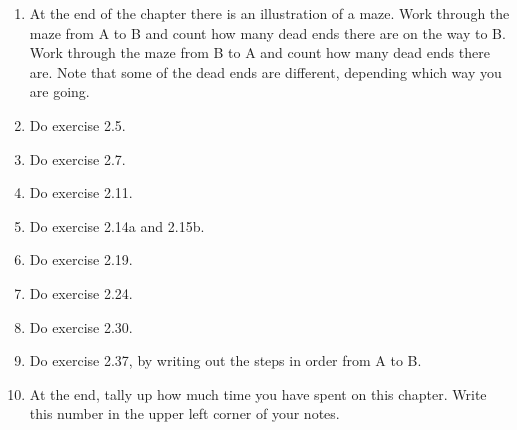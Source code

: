 \begin{enumerate}
\item At the end of the chapter there is an illustration of a maze.
Work through the maze from A to B and count how many dead ends there are on the way to B.
Work through the maze from B to A and count how many dead ends there are.
Note that some of the dead ends are different, depending which way you are going.

\item Do exercise 2.5.

\item Do exercise 2.7.

\item Do exercise 2.11.

\item Do exercise 2.14a and 2.15b.

\item Do exercise 2.19.

\item Do exercise 2.24.

\item Do exercise 2.30.

\item Do exercise 2.37, by writing out the steps in order from A to B.

\item At the end, tally up how much time you have spent on this chapter.
Write this number in the upper left corner of your notes.
\end{enumerate}

